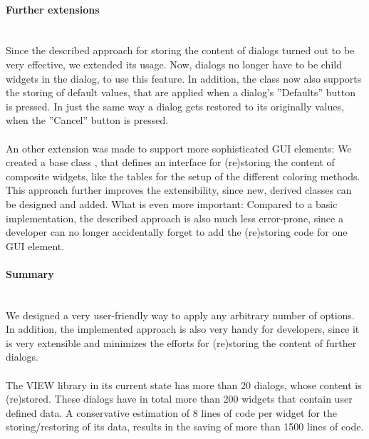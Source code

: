 \paragraph{Further extensions}
\hspace*{\fill}\\
Since the described approach for storing the content of dialogs turned out to be very 
effective, we extended its usage. 
Now, dialogs no longer have to be child widgets in the 
 dialog, to use this feature.
In addition, the  class now also supports the storing of default 
values, that are applied when a dialog's ''Defaults'' button is pressed.
In just the same way a dialog gets restored to its originally values, when the ''Cancel'' 
button is pressed.\\
\\
An other extension was made to support more sophisticated
GUI elements: We created a base class , that defines an 
interface for (re)storing the content of composite widgets, like \eg the tables for the 
setup of the different coloring methods. This approach further improves the 
extensibility, since new, derived  classes can be designed
and added.
What is even more important: Compared to a basic implementation, the described approach is also much less error-prone, since a developer 
can no longer accidentally forget to add the (re)storing code for one GUI element.

\paragraph{Summary}
\hspace*{\fill}\\
We designed a very user-friendly way to apply any arbitrary number of options. 
In addition, the implemented approach is also very handy for developers, since it
is very extensible and minimizes the efforts for (re)storing the content of further dialogs. 
\\
\\
The VIEW library in its current state has more than 20 dialogs, whose content is (re)stored. 
These dialogs have in total more than 200 widgets that contain user defined data.
A conservative estimation of 8 lines of code per widget for the storing/restoring of its data, results in 
the saving of more than 1500 lines of code.
